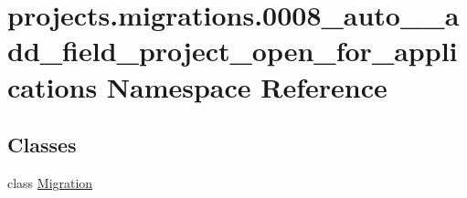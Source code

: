 \hypertarget{namespaceprojects_1_1migrations_1_10008__auto____add__field__project__open__for__applications}{\section{projects.\-migrations.0008\-\_\-auto\-\_\-\-\_\-add\-\_\-field\-\_\-project\-\_\-open\-\_\-for\-\_\-applications Namespace Reference}
\label{namespaceprojects_1_1migrations_1_10008__auto____add__field__project__open__for__applications}
}
\subsection*{Classes}
\begin{DoxyCompactItemize}
\item 
class \hyperlink{classprojects_1_1migrations_1_10008__auto____add__field__project__open__for__applications_1_1_migration}{Migration}
\end{DoxyCompactItemize}
